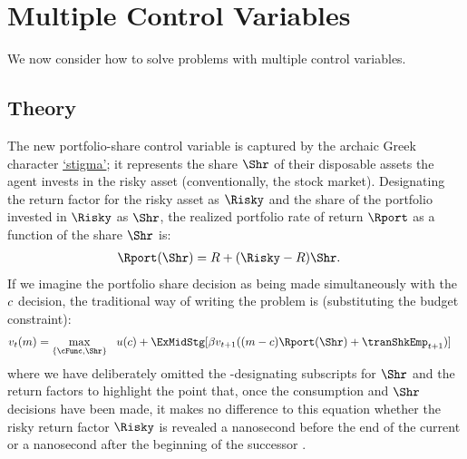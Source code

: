 \hypertarget{multiple-control-variables}{}
\section{Multiple Control Variables}\label{sec:multiple-control-variables}
We now consider how to solve problems with multiple control variables.  

\subsection{Theory}\label{subsec:MCTheory}

The new portfolio-share control variable is captured by the archaic Greek character \href{https://en.wikipedia.org/wiki/Stigma_(ligature)}{`stigma'}; it represents the share $\Shr$ of their disposable assets the agent invests in the risky asset (conventionally, the stock market).  Designating the return factor for the risky asset as $\Risky$ and the share of the portfolio invested in $\Risky$ as $\Shr$, the realized portfolio rate of return $\Rport$ as a function of the share $\Shr$ is:
\begin{equation}\begin{gathered}\begin{aligned}
      \Rport(\Shr) &= \Rfree+(\Risky-\Rfree)\Shr \label{eq:Shr}.
    \end{aligned}\end{gathered}\end{equation}
If we imagine the portfolio share decision as being made simultaneously with the $c$ decision, the traditional way of writing the problem is (substituting the budget constraint):
\begin{equation}\begin{gathered}\begin{aligned}
      \vFunc_{\prd}(m)  & = \max_{\{\cFunc,\Shr\}} ~~  \uFunc(c) + \ExMidStg[\DiscFac \vFunc_{\prd+1}((m-c)\Rport(\Shr) + {\tranShkEmp}_{\prd+1})] \label{eq:Bellmanundated}
    \end{aligned}\end{gathered}\end{equation}
where we have deliberately omitted the {\interval}-designating subscripts for $\Shr$ and the return factors to highlight the point that, once the consumption and $\Shr$ decisions have been made, it makes no difference to this equation whether the risky return factor $\Risky$ is revealed a nanosecond before the end of the current {\interval} or a nanosecond after the beginning of the successor {\interval}.


